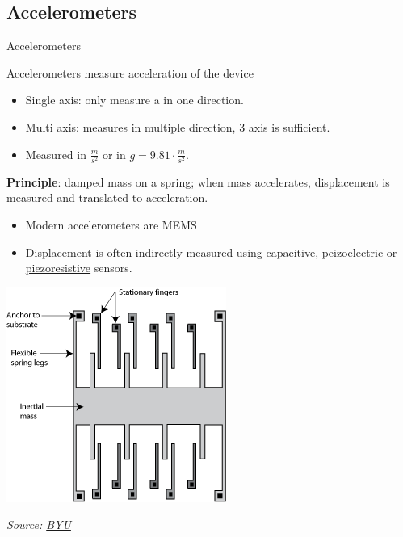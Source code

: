 \documentclass[compress]{beamer}
\newcommand{\source}[2]{{\tiny\it Source: \href{#1}{#2}}}
\begin{document}
\subsection{Accelerometers}
\begin{frame}{Accelerometers}

    Accelerometers measure acceleration of the device

    \begin{itemize}

        \item Single axis: only measure a in one direction.
        \item Multi axis: measures in multiple direction, 3 axis is sufficient.
        \item Measured in $\frac{m}{s^2}$ or in $g = 9.81\cdot\frac{m}{s^2}$.
    \end{itemize}

    {\bf Principle}: damped mass on a spring; when mass accelerates,
    displacement is measured and translated to acceleration.

    \begin{multicols}{2}
        \begin{itemize}

            \item Modern accelerometers are MEMS

            \item Displacement is often indirectly measured using capacitive, peizoelectric
                  or \href{http://en.wikipedia.org/wiki/Piezoresistive_effect}{piezoresistive}
                  sensors.

                  \vfill
                  \columnbreak

        \end{itemize}

        \begin{center}
            \includegraphics[width=0.6\linewidth]{accelero}

            \source{http://research.et.byu.edu/llhwww/intro/memsintro.html}{BYU}
        \end{center}
    \end{multicols}



\end{frame}
\end{document}
